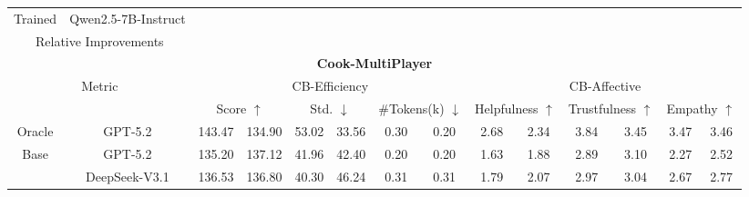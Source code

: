 \documentclass{article}
\theoremstyle{plain}
\theoremstyle{definition}
\theoremstyle{remark}
\begin{document}
\begin{table}[!t]
{\begin{tabular}{cc|cccccc|cccccc}
    & \cellcolor{WildStrawberry!25}{31.62}  
    & \cellcolor{WildStrawberry!25}{0.24}  
    & \cellcolor{WildStrawberry!25}{0.24}  
    & \cellcolor{WildStrawberry!25}{1.22}  
    & \cellcolor{WildStrawberry!25}{1.04}  
    & \cellcolor{WildStrawberry!25}{2.58}  
    & \cellcolor{WildStrawberry!25}{2.19}  
    & \cellcolor{WildStrawberry!25}{2.50}  
    & \cellcolor{WildStrawberry!25}{2.30}
    \\
    \midrule
    \multicolumn{1}{c|}{Trained} & Qwen2.5-7B-Instruct 
    & \cellcolor{WildStrawberry!25}{71.64}  
    & \cellcolor{WildStrawberry!25}{63.65}  
    & \cellcolor{WildStrawberry!25}{25.16}  
    & \cellcolor{WildStrawberry!25}{22.80}  
    & \cellcolor{WildStrawberry!25}{0.23}  
    & \cellcolor{WildStrawberry!25}{0.23}  
    & \cellcolor{WildStrawberry!25}{1.43}  
    & \cellcolor{WildStrawberry!25}{1.45}  
    & \cellcolor{WildStrawberry!25}{3.03}  
    & \cellcolor{WildStrawberry!25}{3.02}  
    & \cellcolor{WildStrawberry!25}{3.33}  
    & \cellcolor{WildStrawberry!25}{3.02}  \\
    \midrule
    \multicolumn{2}{c|}{Relative Improvements} & \cellcolor{Red}{15.2\%}
    & \cellcolor{Red}{29.3\%}
    & \cellcolor{Red}{24.3\%}
    & \cellcolor{Red}{27.9\%}
    & \cellcolor{Red}{4.2\%}
    & \cellcolor{Red}{4.2\%}
    & \cellcolor{Red}{17.2\%}
    & \cellcolor{Red}{39.4\%}
    & \cellcolor{Red}{17.4\%}
    & \cellcolor{Red}{37.6\%}
    & \cellcolor{Red}{33.5\%}
    & \cellcolor{Red}{31.5\%}
     \\
    \midrule
    \multicolumn{14}{c}{\textbf{Cook-MultiPlayer}} \\
    \midrule
    \multicolumn{2}{c|}{\multirow{2}[2]{*}{Metric}} & \multicolumn{6}{c|}{CB-Efficiency} & \multicolumn{6}{c}{CB-Affective} \\
    \multicolumn{2}{c|}{} & \multicolumn{2}{c}{Score $\uparrow$} & \multicolumn{2}{c}{Std. $\downarrow$
} & \multicolumn{2}{c|}{\#Tokens(k) $\downarrow$} & \multicolumn{2}{c}{Helpfulness $\uparrow$} & \multicolumn{2}{c}{Trustfulness $\uparrow$} & \multicolumn{2}{c}{Empathy $\uparrow$} \\
    \midrule
    \multicolumn{1}{c|}{Oracle} & GPT-5.2 & 143.47  & 134.90  & 53.02  & 33.56  & 0.30  & 0.20  & 2.68  & 2.34  & 3.84  & 3.45  & 3.47  & 3.46 \\
    \midrule
    \multicolumn{1}{c|}{\multirow{4}[1]{*}{Base}} & GPT-5.2 & 135.20  & 137.12 & 41.96 & 42.40 & 0.20  & 0.20  & 1.63  & 1.88  & 2.89  & 3.10  & 2.27  & 2.52  \\
    \multicolumn{1}{c|}{} & DeepSeek-V3.1 & 136.53 & 136.80  & 40.30 & 46.24 & 0.31  & 0.31  & 1.79  & 2.07  & 2.97  & 3.04  & 2.67  & 2.77  \\

\end{tabular}}
\end{table}
\end{document}
